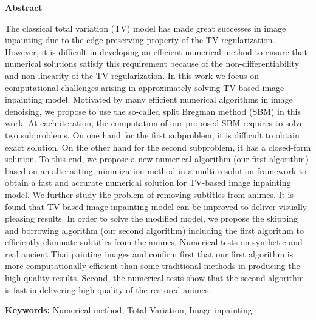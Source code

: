 \thispagestyle{empty}
\vspace{2 cm}
{\huge \bf Abstract}

\vspace{2 cm}

\hspace{1cm} The classical total variation (TV) model has made great successes in image inpainting due to the edge-preserving property of the TV regularization. However, it is difficult in developing an efficient numerical method to ensure that numerical solutions satisfy this requirement because of the non-differentiability and non-linearity of the TV regularization. In this work we focus on computational challenges arising in approximately solving TV-based image inpainting model. Motivated by many efficient numerical algorithms in image denoising, we propose to use the so-called split Bregman method (SBM) in this work. At each iteration, the computation of our proposed SBM requires to solve two subproblems. On one hand for the first subproblem, it is difficult to obtain exact solution. On the other hand for the second subproblem, it has a closed-form solution. To this end, we propose a new numerical algorithm (our first algorithm) based on an alternating minimization method in a multi-resolution framework to obtain a fast and accurate numerical solution for TV-based image inpainting model. We further study the problem of removing subtitles from animes. It is found that TV-based image inpainting model can be improved to deliver visually pleasing results. In order to solve the modified model, we propose the skipping and borrowing algorithm (our second algorithm) including the first algorithm to efficiently eliminate subtitles from the animes. Numerical tests on synthetic and real ancient Thai painting images and confirm first that our first algorithm is more computationally efficient than some traditional methods in producing the high quality results. Second, the numerical tests show that the second algorithm is fast in delivering high quality of the restored animes.   

\vspace{1 cm}

{\bf{Keywords:}} Numerical method, Total Variation, Image inpainting \\
\newpage